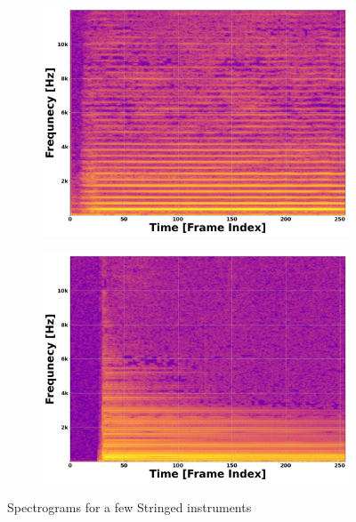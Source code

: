 \documentclass[12pt,letterpaper]{article}
\begin{document}
\begin{figure}[H]
	\begin{subfigure}{0.45\textwidth}
	\centering
	\includegraphics[scale=0.18]{../FiguresSpectrogram/CELLO-F4}
	\end{subfigure}
	\begin{subfigure}{0.45\textwidth}
	\centering
	\includegraphics[scale=0.18]{../FiguresSpectrogram/Guitar-B2}
	\end{subfigure}
\caption{Spectrograms for a few Stringed instruments}	
\label{fig-PropertiesChordophones}
\end{figure}
\end{document}
